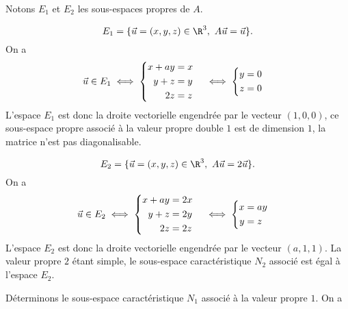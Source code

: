 {\begin{enumerate}
{Notons $E_1$ et $E_2$ les sous-espaces propres de $A$.

$$E_{1}=\{\vec u=(x,y,z)\in\R^3,\ A\vec u =\vec u\}.$$
On a 
$$\vec u\in E_{1}\iff \left\{\begin{align*} x+ay&=x\cr y+z&=y\cr 2z&=z\end{align*}\right.\iff\left\{\begin{align*}y&=0\cr z&=0\end{align*}\right.$$ 
L'espace $E_1$ est donc la droite vectorielle engendrée par le vecteur $(1,0,0)$, ce sous-espace propre associé à la valeur propre double $1$ est de dimension $1$, la matrice n'est pas diagonalisable.
 
$$E_{2}=\{\vec u=(x,y,z)\in\R^3,\ A\vec u =2\vec u\}.$$
On a 
$$\vec u\in E_{2}\iff \left\{\begin{align*}x+ay&=2x\cr y+z&=2y\cr 2z&=2z\end{align*}\right.\iff\left\{\begin{align*}x&=ay\cr y&=z\end{align*}\right.$$ 
L'espace $E_2$ est donc la droite vectorielle engendrée par le vecteur $(a,1,1)$. La valeur propre $2$ étant simple, le sous-espace caractéristique $N_2$ associé est égal à l'espace $E_2$.
 
Déterminons le sous-espace caractéristique $N_1$ associé à la valeur propre $1$. On a 

}
\end{enumerate}}
